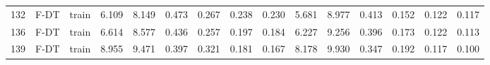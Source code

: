 \begin{table}
\begin{tabular}{@{\hskip3pt}c@{\hskip3pt}c@{\hskip3pt}c@{\hskip3pt}c@{\hskip3pt}c@{\hskip3pt}c@{\hskip3pt}c@{\hskip3pt}c@{\hskip3pt}c@{\hskip3pt}c@{\hskip3pt}c@{\hskip3pt}c@{\hskip3pt}c@{\hskip3pt}c@{\hskip3pt}c}
        132 &           F-DT &                     train &             6.109 &       8.149 &         0.473 &       0.267 &       0.238 &        0.230 &               5.681 &       8.977 &         0.413 &       0.152 &       0.122 &        0.117 \\
        136 &           F-DT &                     train &             6.614 &       8.577 &         0.436 &       0.257 &       0.197 &        0.184 &               6.227 &       9.256 &         0.396 &       0.173 &       0.122 &        0.113 \\
        139 &           F-DT &                     train &             8.955 &       9.471 &         0.397 &       0.321 &       0.181 &        0.167 &               8.178 &       9.930 &         0.347 &       0.192 &       0.117 &        0.100 \\
\bottomrule
\end{tabular}
\end{table}
